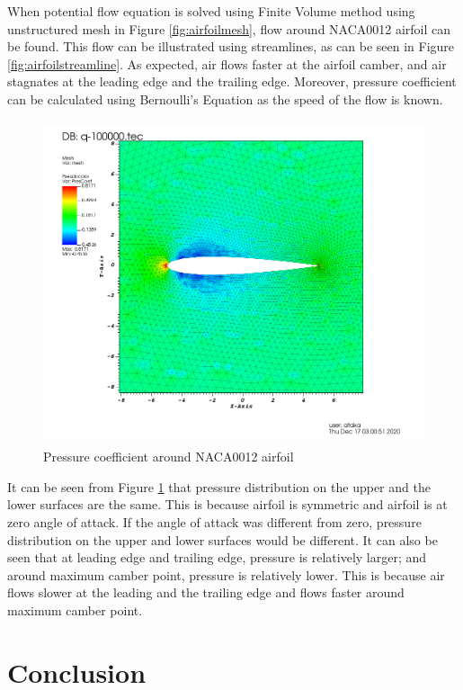 \documentclass[letterpaper,12pt]{article}
\begin{document}
When potential flow equation is solved using Finite Volume method using unstructured mesh in Figure \ref{fig:airfoilmesh},
flow around NACA0012 airfoil can be found. This flow can be illustrated using streamlines, as can be seen in 
Figure \ref{fig:airfoilstreamline}. As expected, air flows faster at the airfoil camber, and air stagnates at the 
leading edge and the trailing edge. Moreover, pressure coefficient can be calculated using Bernoulli's Equation 
as the speed of the flow is known.

\newpage

\begin{figure} [!h]
	\centering
	\includegraphics[height = 9.5cm]{graph/medium/medium_pressure0000.png}
	\caption{Pressure coefficient around NACA0012 airfoil}
    \label{fig:airfoilpressure}
\end{figure}

It can be seen from Figure \ref{fig:airfoilpressure} that pressure distribution on the upper and the lower surfaces are the same.
This is because airfoil is symmetric and airfoil is at zero angle of attack. If the angle of attack was different from zero, 
pressure distribution on the upper and lower surfaces would be different. It can also be seen that at leading edge and trailing edge,
pressure is relatively larger; and around maximum camber point, pressure is relatively lower. This is because air flows slower at the 
leading and the trailing edge and flows faster around maximum camber point.

\section{Conclusion}
\end{document}
